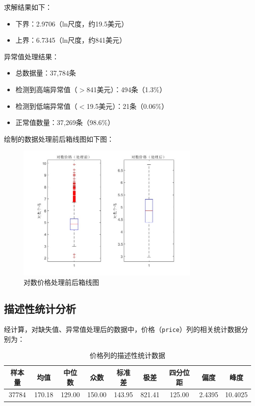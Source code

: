 \documentclass[12pt]{article}
\begin{document}
\begin{CJK}{UTF8}{gbsn}
	求解结果如下：
	
	\begin{itemize}
		\item 下界：2.9706（ln尺度，约19.5美元）
		\item 上界：6.7345（ln尺度，约841美元）
	\end{itemize}
	
	异常值处理结果：
	
	\begin{itemize}
		\item 总数据量：37,784条
		\item 检测到高端异常值（$>$841美元）：494条（1.3\%）
		\item 检测到低端异常值（$<$19.5美元）：21条（0.06\%）
		\item 正常值数量：37,269条（98.6\%）
	\end{itemize}
	
	绘制的数据处理前后箱线图如下图：
	
	\begin{figure}[H]
		\centering
		\includegraphics[width=0.8\textwidth]{pic/3.jpg} %
		\caption{对数价格处理前后箱线图}
		\label{fig:3}
	\end{figure}
	
	\subsection{描述性统计分析}
	经计算，对缺失值、异常值处理后的数据中，价格（\texttt{price}）列的相关统计数据分别为：
	
	\begin{table}[H] %
		\centering
		\begin{tabular}{ccccccccc}
			\toprule
			样本量 & 均值 & 中位数 & 众数 & 标准差 & 极差 & 四分位距 & 偏度 & 峰度 \\
			\midrule
			37784 & 170.18 & 129.00 & 150.00 & 143.95 & 821.41 & 125.00 & 2.4395 & 10.4025 \\
			\bottomrule
		\end{tabular}
		\caption{价格列的描述性统计数据}
	\end{table}
	

\end{CJK}
\end{document}

